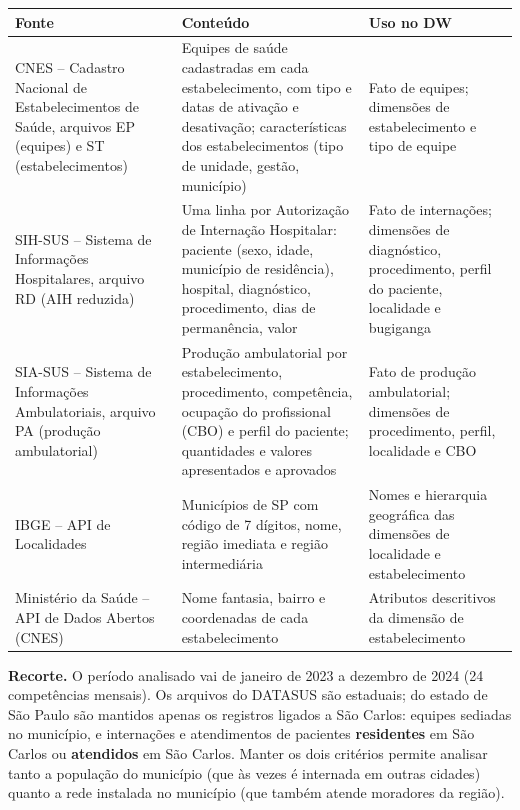 \documentclass[12pt,a4paper]{article}
\begin{document}
{\small{}\begin{longtable}{|>{\raggedright\arraybackslash}p{}|>{\raggedright\arraybackslash}p{}|>{\raggedright\arraybackslash}p{}|}\hline\rowcolor{azul}\color{white}\bfseries Fonte & \color{white}\bfseries Conteúdo & \color{white}\bfseries Uso no DW \\ \hline\endhead
CNES – Cadastro Nacional de Estabelecimentos de Saúde, arquivos EP (equipes) e ST (estabelecimentos) & Equipes de saúde cadastradas em cada estabelecimento, com tipo e datas de ativação e desativação; características dos estabelecimentos (tipo de unidade, gestão, município) & Fato de equipes; dimensões de estabelecimento e tipo de equipe \\ \hline
SIH-SUS – Sistema de Informações Hospitalares, arquivo RD (AIH reduzida) & Uma linha por Autorização de Internação Hospitalar: paciente (sexo, idade, município de residência), hospital, diagnóstico, procedimento, dias de permanência, valor & Fato de internações; dimensões de diagnóstico, procedimento, perfil do paciente, localidade e bugiganga \\ \hline
SIA-SUS – Sistema de Informações Ambulatoriais, arquivo PA (produção ambulatorial) & Produção ambulatorial por estabelecimento, procedimento, competência, ocupação do profissional (CBO) e perfil do paciente; quantidades e valores apresentados e aprovados & Fato de produção ambulatorial; dimensões de procedimento, perfil, localidade e CBO \\ \hline
IBGE – API de Localidades & Municípios de SP com código de 7 dígitos, nome, região imediata e região intermediária & Nomes e hierarquia geográfica das dimensões de localidade e estabelecimento \\ \hline
Ministério da Saúde – API de Dados Abertos (CNES) & Nome fantasia, bairro e coordenadas de cada estabelecimento & Atributos descritivos da dimensão de estabelecimento \\ \hline\end{longtable}}

\textbf{Recorte.} O período analisado vai de janeiro de 2023 a dezembro de 2024 (24 competências mensais). Os arquivos do DATASUS são estaduais; do estado de São Paulo são mantidos apenas os registros ligados a São Carlos: equipes sediadas no município, e internações e atendimentos de pacientes \textbf{residentes} em São Carlos ou \textbf{atendidos} em São Carlos. Manter os dois critérios permite analisar tanto a população do município (que às vezes é internada em outras cidades) quanto a rede instalada no município (que também atende moradores da região).
\end{document}
